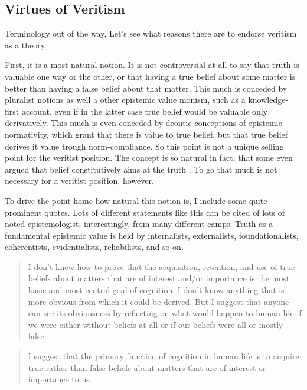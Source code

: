 \documentclass[12pt,numbers=noenddot]{scrartcl}
\begin{document}
\subsection { Virtues of Veritism }
Terminology out of the way, Let's see what reasons there are to endorse veritism as a theory.

First, it is a most natural notion. It is not controversial at all to say that truth is valuable one way or the other, or that having a true belief about some matter is better than having a false belief about that matter. This much is conceded by pluralist notions as well a other epistemic value monism, such as a knowledge-first account, even if in the latter case true belief would be valuable only derivatively. This much is even conceded by deontic conceptions of epistemic normativity, which grant that there is value to true belief, but that true belief derives it value trough norm-compliance. So this point is not a unique selling point for the veritist position. The concept is so natural in fact, that some even argued that belief constitutively aims at the truth \autocite{Shah2003-SHAHTG,Velleman2000-VELOTA}. To go that much is not necessary for a veritist position, however\autocite[361]{Berker2013-BERETA-2}.

To drive the point home how natural this notion is, I include some quite prominent quotes. Lots of different statements like this can be cited of lots of noted epistemologist, interestingly, from many different camps. Truth as a fundamental epistemic value is held by internalists, externalists, foundationalists, coherentists, evidentialists, reliabilists, and so on.

\begin{quote}
I don't know how to prove that the acquisition, retention, and use of true beliefs about matters that are of interest and/or importance is the most basic and most central goal of cognition. I don't know anything that is more obvious from which it could be derived. But I suggest that anyone can see its obviousness by reflecting on what would happen to human life if we were either without beliefs at all or if our beliefs were all or mostly false. \textcite[30]{Alston2005-ALSBJD}
\end{quote}

\begin{quote}
 I suggest that the primary function of cognition in human life is to acquire true rather than false beliefs about matters that are of interest or importance to us. \textcite[29]{Alston2005-ALSBJD}
\end{quote}
\end{document}
